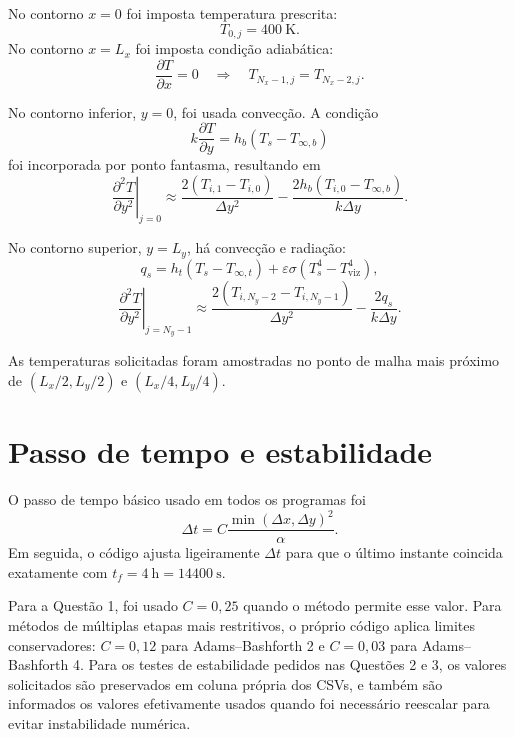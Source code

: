 \documentclass[12pt,a4paper]{article}
\newcommand{\si}[1]{\ensuremath{\mathrm{#1}}}
\newcommand{\second}{s}
\newcommand{\hour}{h}
\newcommand{\kelvin}{K}
\begin{document}
No contorno $x=0$ foi imposta temperatura prescrita:
\begin{equation}
    T_{0,j}=400\ \si{\kelvin}.
\end{equation}
No contorno $x=L_x$ foi imposta condição adiabática:
\begin{equation}
    \frac{\partial T}{\partial x}=0
    \quad\Rightarrow\quad
    T_{N_x-1,j}=T_{N_x-2,j}.
\end{equation}

No contorno inferior, $y=0$, foi usada convecção. A condição
\begin{equation}
    k\frac{\partial T}{\partial y}=h_b(T_s-T_{\infty,b})
\end{equation}
foi incorporada por ponto fantasma, resultando em
\begin{equation}
    \left.\frac{\partial^2 T}{\partial y^2}\right|_{j=0}
    \approx
    \frac{2(T_{i,1}-T_{i,0})}{\Delta y^2}
    -
    \frac{2h_b(T_{i,0}-T_{\infty,b})}{k\Delta y}.
\end{equation}

No contorno superior, $y=L_y$, há convecção e radiação:
\begin{equation}
    q_s =
    h_t(T_s-T_{\infty,t})
    +
    \varepsilon\sigma(T_s^4-T_{\text{viz}}^4),
\end{equation}
\begin{equation}
    \left.\frac{\partial^2 T}{\partial y^2}\right|_{j=N_y-1}
    \approx
    \frac{2(T_{i,N_y-2}-T_{i,N_y-1})}{\Delta y^2}
    -
    \frac{2q_s}{k\Delta y}.
\end{equation}

As temperaturas solicitadas foram amostradas no ponto de malha mais próximo de
$(L_x/2,L_y/2)$ e $(L_x/4,L_y/4)$.

\section{Passo de tempo e estabilidade}

O passo de tempo básico usado em todos os programas foi
\begin{equation}
    \Delta t = C\frac{\min(\Delta x,\Delta y)^2}{\alpha}.
    \label{eq:dt}
\end{equation}
Em seguida, o código ajusta ligeiramente $\Delta t$ para que o último instante
coincida exatamente com $t_f=4\ \si{\hour}=14400\ \si{\second}$.

Para a Questão 1, foi usado $C=0{,}25$ quando o método permite esse valor. Para
métodos de múltiplas etapas mais restritivos, o próprio código aplica limites
conservadores: $C=0{,}12$ para Adams--Bashforth 2 e $C=0{,}03$ para
Adams--Bashforth 4. Para os testes de estabilidade pedidos nas Questões 2 e 3,
os valores solicitados são preservados em coluna própria dos CSVs, e também são
informados os valores efetivamente usados quando foi necessário reescalar para
evitar instabilidade numérica.
\end{document}
